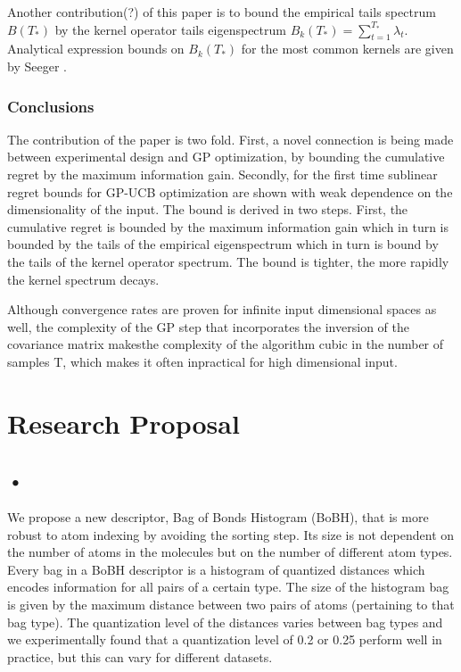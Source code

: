 \documentclass[10pt,journal,a4paper]{IEEEtran}
\begin{document}
Another contribution(?) of this paper is to bound the empirical tails spectrum $B(T_{*})$ by the kernel operator tails eigenspectrum $B_k(T_{*}) = \sum_{t=1}^{T_*}\lambda_t $. Analytical expression bounds on $B_k(T_{*})$ for the most common kernels are given by Seeger \cite{NonGP}.		
		
\subsubsection{Conclusions}		
The contribution of the paper is two fold. First, a novel connection is being made between experimental design and GP optimization, by bounding the cumulative regret by the maximum information gain. Secondly, for the first time sublinear regret bounds for GP-UCB optimization are shown with weak dependence on the dimensionality of the input. 		
 The bound is derived in two steps. First, the cumulative regret is bounded by the maximum information gain which in turn is bounded by the tails of the empirical eigenspectrum which in turn is bound by the tails of the kernel operator spectrum.	The bound is tighter, the more rapidly the kernel spectrum decays. 

Although convergence rates are proven for infinite input dimensional spaces as well, the complexity of the GP step that incorporates the inversion of the covariance matrix makesthe complexity of the algorithm cubic in the number of samples T, which makes it often inpractical for high dimensional input.

\section{Research Proposal}
\subsection*{•}
We propose a new descriptor, Bag of Bonds Histogram (BoBH),
that is more robust to atom indexing by avoiding the sorting step. Its size is not dependent on the number of atoms in the molecules but on the number of different atom types. Every bag in a BoBH descriptor is a histogram of quantized distances which encodes information for all  pairs of a certain type. The size of the histogram bag is given by the maximum distance between two pairs of atoms (pertaining to that bag type). The quantization level of the distances varies between bag types and we experimentally found that a quantization level of 0.2 or 0.25 perform well in practice, but this can vary for different datasets.
\end{document}
